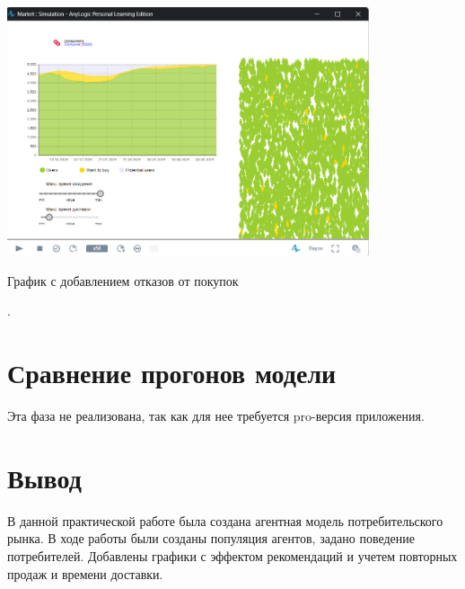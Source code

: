 \begin{image}
	\includegraphics[width=0.8\textwidth]{2023-03-28_17-48-54}
	\caption{График с добавлением отказов от покупок}
	\label{fig:refusals}.
\end{image}


\section{Сравнение прогонов модели}
Эта фаза не реализована, так как для нее требуется pro-версия приложения.

\clearpage

\section*{\LARGE Вывод}
В данной практической работе была создана агентная модель потребительского
рынка. В ходе работы были созданы популяция агентов, задано поведение
потребителей. Добавлены графики с эффектом рекомендаций и учетем повторных
продаж и времени доставки.

